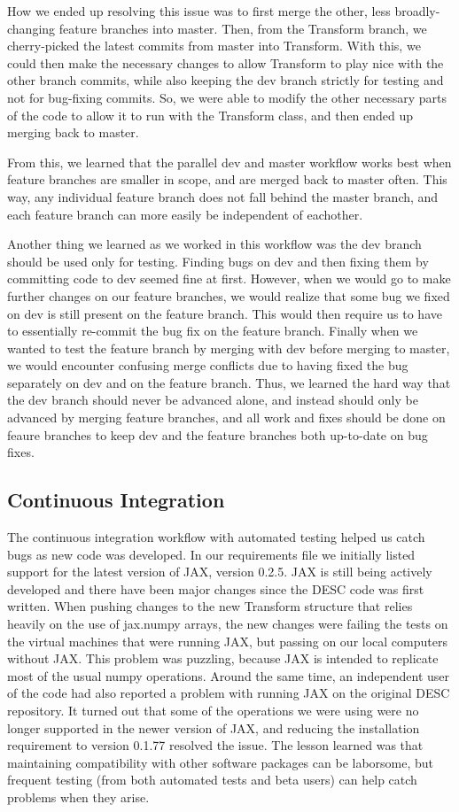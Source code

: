 \documentclass{article}
\begin{document}
How we ended up resolving this issue was to first merge the other, less broadly-changing feature branches into master.
Then, from the Transform branch, we cherry-picked the latest commits from master into Transform.
With this, we could then make the necessary changes to allow Transform to play nice with the other branch commits, while also keeping the dev branch strictly for testing and not for bug-fixing commits.
So, we were able to modify the other necessary parts of the code to allow it to run with the Transform class, and then ended up merging back to master.

From this, we learned that the parallel dev and master workflow works best when feature branches are smaller in scope, and are merged back to master often.
This way, any individual feature branch does not fall behind the master branch, and each feature branch can more easily be independent of eachother.

Another thing we learned as we worked in this workflow was the dev branch should be used only for testing.
Finding bugs on dev and then fixing them by committing code to dev seemed fine at first.
However, when we would go to make further changes on our feature branches, we would realize that some bug we fixed on dev is still present on the feature branch.
This would then require us to have to essentially re-commit the bug fix on the feature branch.
Finally when we wanted to test the feature branch by merging with dev before merging to master, we would encounter confusing merge conflicts due to having fixed the bug separately on dev and on the feature branch.
Thus, we learned the hard way that the dev branch should never be advanced alone, and instead should only be advanced by merging feature branches, and all work and fixes should be done on feaure branches to keep dev and the feature branches both up-to-date on bug fixes.

\subsection{Continuous Integration}

The continuous integration workflow with automated testing helped us catch bugs as new code was developed.
In our requirements file we initially listed support for the latest version of JAX, version 0.2.5.
JAX is still being actively developed and there have been major changes since the DESC code was first written.
When pushing changes to the new Transform structure that relies heavily on the use of jax.numpy arrays, the new changes were failing the tests on the virtual machines that were running JAX, but passing on our local computers without JAX.
This problem was puzzling, because JAX is intended to replicate most of the usual numpy operations.
Around the same time, an independent user of the code had also reported a problem with running JAX on the original DESC repository.
It turned out that some of the operations we were using were no longer supported in the newer version of JAX, and reducing the installation requirement to version 0.1.77 resolved the issue.
The lesson learned was that maintaining compatibility with other software packages can be laborsome, but frequent testing (from both automated tests and beta users) can help catch problems when they arise.
\end{document}
